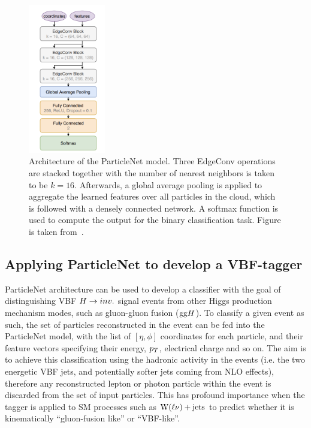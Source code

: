 \begin{figure}[htbp]
    \centering
    \includegraphics[width=0.3\textwidth]{VBFML/particlenet_arch.png}
    \caption{Architecture of the ParticleNet model. Three EdgeConv operations are stacked together
    with the number of nearest neighbors is taken to be $k=16$. Afterwards, a global average pooling
    is applied to aggregate the learned features over all particles in the cloud, which is followed
    with a densely connected network. A softmax function is used to compute the output for the binary
    classification task. Figure is taken from~\cite{CMS:ParticleNetPaper}.}
    \label{fig:particlenet_arch}
\end{figure}

\subsection{Applying ParticleNet to develop a VBF-tagger}

ParticleNet architecture can be used to develop a classifier with the goal of distinguishing VBF $H \rightarrow inv.$ signal events
from other Higgs production mechanism modes, such as gluon-gluon fusion ($\mathrm{gg}H$). 
To classify a given event as such, the set of particles reconstructed
in the event can be fed into the ParticleNet model, with the list of $[\eta, \phi]$ coordinates for each particle, and their feature
vectors specifying their energy, $p_T$, electrical charge and so on. The aim is to achieve this classification using the hadronic
activity in the events (i.e. the two energetic VBF jets, and potentially softer jets coming from NLO effects), therefore any
reconstructed lepton or photon particle within the event is discarded from the set of input particles. This has profound importance
when the tagger is applied to SM processes such as $\mathrm{W}(\ell\nu)+\textrm{jets}$ to predict whether it is kinematically ``gluon-fusion like'' or ``VBF-like''.

